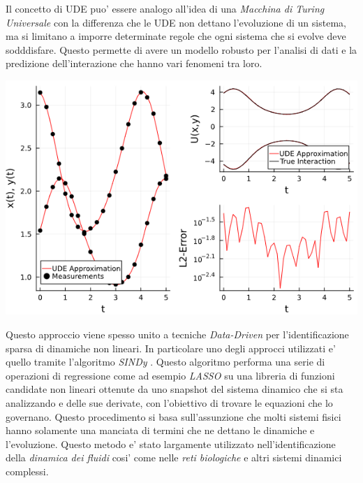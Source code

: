 Il concetto di UDE puo' essere analogo all'idea di una \emph{Macchina di Turing Universale}
\cite{wiki:Universal_Turing_machine} con la differenza che le UDE non dettano 
l'evoluzione di un sistema, ma si limitano a imporre determinate regole che 
ogni sistema che si evolve deve sodddisfare. Questo permette di avere un modello robusto 
per l'analisi di dati e la predizione dell'interazione che hanno vari fenomeni tra loro.

\begin{minipage}{\linewidth}
    \centering
    \includegraphics[scale=0.7]{img/ude_approx.png}
    \label{fig:UDE_approx}
\end{minipage}

Questo approccio viene spesso unito a tecniche \emph{Data-Driven} \cite{datadrivendiffeq} per l'identificazione
sparsa di dinamiche non lineari. In particolare uno degli approcci utilizzati 
e' quello tramite l'algoritmo \emph{SINDy} \cite{wiki:Sparse_identification_of_non-linear_dynamics}. 
Questo algoritmo performa una serie di operazioni di regressione come 
ad esempio \emph{LASSO} su una libreria di funzioni candidate non lineari ottenute
da uno snapshot del sistema dinamico che si sta analizzando e delle sue derivate, 
con l'obiettivo di trovare le equazioni che lo governano. Questo procedimento 
si basa sull'assunzione che molti sistemi fisici hanno solamente una manciata di 
termini che ne dettano le dinamiche e l'evoluzione. Questo metodo e' stato largamente
utilizzato nell'identificazione della \emph{dinamica dei fluidi} cosi' come
nelle \emph{reti biologiche} e altri sistemi dinamici complessi.